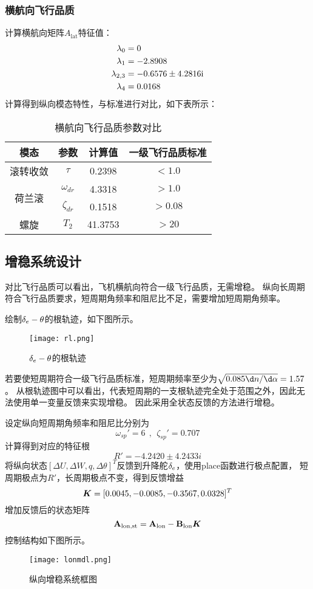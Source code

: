 \subsubsection{横航向飞行品质}
计算横航向矩阵$A_{\text{lat}}$特征值：
$$
\begin{aligned}
\lambda_0&=0\\
\lambda_{1}&=-2.8908\\
\lambda_{2,3}&=-0.6576\pm 4.2816{\mathrm i}\\
\lambda_{4}&=0.0168
\end{aligned}
$$
计算得到纵向模态特性，与标准进行对比，如下表所示：
\begin{table}[!h]
\centering
\caption{横航向飞行品质参数对比}
\begin{tabular}{@{}cccc@{}}
\toprule
模态&参数 & 计算值 & 一级飞行品质标准 \\ \midrule
滚转收敛&$\tau$&0.2398&$<1.0$\\ \midrule
\multirow{2}{*}{荷兰滚}&$\omega_{dr}$ & 4.3318 & $>1.0$ \\
&$\zeta_{dr}$ & 0.1518 & $>0.08$ \\ \midrule
螺旋&$T_2$ &41.3753 & $>20$ \\ \bottomrule
\end{tabular}
\end{table}
\clearpage
\subsection{增稳系统设计}
对比飞行品质可以看出，飞机横航向符合一级飞行品质，无需增稳。
纵向长周期符合飞行品质要求，短周期角频率和阻尼比不足，需要增加短周期角频率。

绘制${\delta_e}-\theta$的根轨迹，如下图所示。
\begin{figure}[!h]
\centering\texttt{[image: rl.png]}
\caption{${\delta_e}-\theta$的根轨迹}
\label{rl}
\end{figure}

若要使短周期符合一级飞行品质标准，短周期频率至少为$\sqrt{0.085\d n/\d\alpha}=1.57$。
从根轨迹图中可以看出，代表短周期的一支根轨迹完全处于范围之外，因此无法使用单一变量反馈来实现增稳。
因此采用全状态反馈的方法进行增稳。

设定纵向短周期角频率和阻尼比分别为
$$\omega_{sp}'=6\ \ ,\ \ \zeta_{sp}'=0.707$$
计算得到对应的特征根
$$R'=-4.2420\pm4.2433i$$
将纵向状态$[\Delta U,\Delta W,q,\Delta\theta]^T$反馈到升降舵${\delta_e}$，使用place函数进行极点配置，
短周期极点为$R'$，长周期极点不变，得到反馈增益
$${\bm K}=[0.0045,-0.0085,-0.3567,0.0328]^T$$
增加反馈后的状态矩阵
$${\mathbf A}_{\text{lon,st}}={\mathbf A}_{\text{lon}}-{\mathbf B}_{\text{lon}}{\bm K}$$
控制结构如下图所示。
\begin{figure}[!h]
\centering\texttt{[image: lonmdl.png]}
\caption{纵向增稳系统框图}
\label{lm}
\end{figure}

